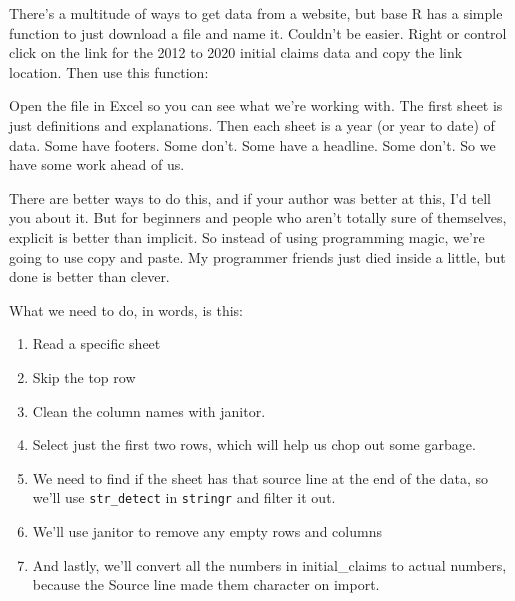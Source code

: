 \documentclass[]{book}
\newenvironment{Shaded}{\begin{snugshade}}{\end{snugshade}}
\newcommand{\DataTypeTok}[1]{\textcolor[rgb]{0.13,0.29,0.53}{#1}}
\newcommand{\KeywordTok}[1]{\textcolor[rgb]{0.13,0.29,0.53}{\textbf{#1}}}
\newcommand{\NormalTok}[1]{#1}
\newcommand{\StringTok}[1]{\textcolor[rgb]{0.31,0.60,0.02}{#1}}
\providecommand{\tightlist}{%
  \setlength{\itemsep}{0pt}\setlength{\parskip}{0pt}}
\begin{document}
There's a multitude of ways to get data from a website, but base R has a simple function to just download a file and name it. Couldn't be easier. Right or control click on the link for the 2012 to 2020 initial claims data and copy the link location. Then use this function:

\begin{Shaded}
\end{Shaded}

Open the file in Excel so you can see what we're working with. The first sheet is just definitions and explanations. Then each sheet is a year (or year to date) of data. Some have footers. Some don't. Some have a headline. Some don't. So we have some work ahead of us.

There are better ways to do this, and if your author was better at this, I'd tell you about it. But for beginners and people who aren't totally sure of themselves, explicit is better than implicit. So instead of using programming magic, we're going to use copy and paste. My programmer friends just died inside a little, but done is better than clever.

What we need to do, in words, is this:

\begin{enumerate}
\def\labelenumi{\arabic{enumi}.}
\tightlist
\item
  Read a specific sheet
\item
  Skip the top row
\item
  Clean the column names with janitor.
\item
  Select just the first two rows, which will help us chop out some garbage.
\item
  We need to find if the sheet has that source line at the end of the data, so we'll use \texttt{str\_detect} in \texttt{stringr} and filter it out.
\item
  We'll use janitor to remove any empty rows and columns
\item
  And lastly, we'll convert all the numbers in initial\_claims to actual numbers, because the Source line made them character on import.
\end{enumerate}
\end{document}
